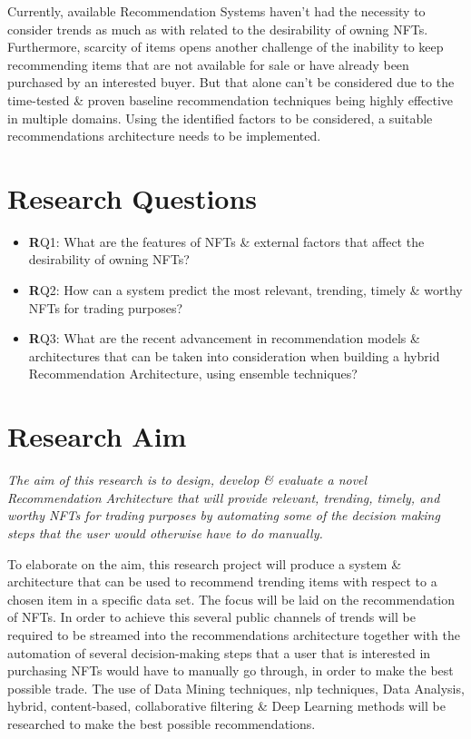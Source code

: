 \documentclass[a4paper, 12pt, oneside]{report}
\begin{document}
Currently, available Recommendation Systems haven't had the necessity to consider trends as much as with related to the desirability of owning NFTs. Furthermore, scarcity of items opens another challenge of the inability to keep recommending items that are not available for sale or have already been purchased by an interested buyer. But that alone can't be considered due to the time-tested \& proven baseline recommendation techniques being highly effective in multiple domains. Using the identified factors to be considered, a suitable recommendations architecture needs to be implemented.

\chapter{Research Questions}

\begin{itemize}[label={}]
  \item {\textbf RQ1:} What are the features of NFTs \& external factors that affect the desirability of owning NFTs?
  \item {\textbf RQ2:} How can a system predict the most relevant, trending, timely \& worthy NFTs for trading purposes?
  \item {\textbf RQ3:} What are the recent advancement in recommendation models \& architectures that can be taken into consideration when building a hybrid Recommendation Architecture, using ensemble techniques? 
\end{itemize}

\chapter{Research Aim}
\textit{The aim of this research is to design, develop \& evaluate a novel Recommendation Architecture that will provide relevant, trending, timely, and worthy NFTs for trading purposes by automating some of the decision making steps that the user would otherwise have to do manually.}

\bigbreak
To elaborate on the aim, this research project will produce a system \& architecture that can be used to recommend trending items with respect to a chosen item in a specific data set. The focus will be laid on the recommendation of NFTs. In order to achieve this several public channels of trends will be required to be streamed into the recommendations architecture together with the automation of several decision-making steps that a user that is interested in purchasing NFTs would have to manually go through, in order to make the best possible trade. The use of Data Mining techniques, \Gls{nlp} techniques, Data Analysis, hybrid, content-based, collaborative filtering \& Deep Learning methods will be researched to make the best possible recommendations.
\end{document}
